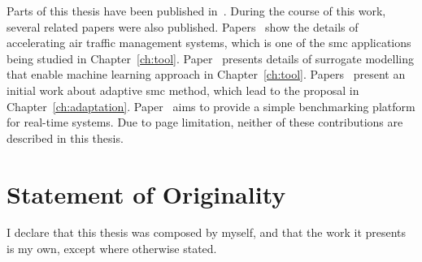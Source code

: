 Parts of this thesis have been published in~\cite{chau13fpt,chau13arc,chau14trets,chau14fccm}.
During the course of this work, several related papers were also published.
Papers~\cite{chau13acm,eele13cdc,eele13gnc} show the details of accelerating air traffic management systems, which is one of the \gls{smc} applications being studied in Chapter~\ref{ch:tool}.
Paper~\cite{kurek14fccm} presents details of surrogate modelling that enable machine learning approach in Chapter~\ref{ch:tool}.
Papers~\cite{chau12fpl,niu13fccm} present an initial work about adaptive \gls{smc} method, which lead to the proposal in Chapter~\ref{ch:adaptation}.
Paper~\cite{chau12heart} aims to provide a simple benchmarking platform for real-time systems.
Due to page limitation, neither of these contributions are described in this thesis.

\section{Statement of Originality}

I declare that this thesis was composed by myself, and that the work it presents is my own, except where otherwise stated.

